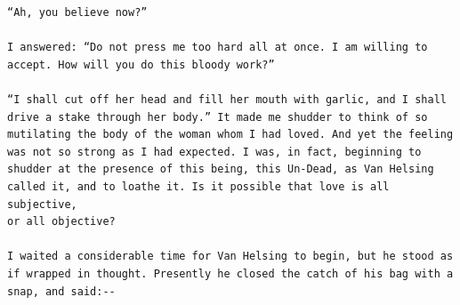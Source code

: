 \documentclass{article}
\begin{document}
\begin{verbatim}
“Ah, you believe now?”

I answered: “Do not press me too hard all at once. I am willing to
accept. How will you do this bloody work?”

“I shall cut off her head and fill her mouth with garlic, and I shall
drive a stake through her body.” It made me shudder to think of so
mutilating the body of the woman whom I had loved. And yet the feeling
was not so strong as I had expected. I was, in fact, beginning to
shudder at the presence of this being, this Un-Dead, as Van Helsing
called it, and to loathe it. Is it possible that love is all subjective,
or all objective?

I waited a considerable time for Van Helsing to begin, but he stood as
if wrapped in thought. Presently he closed the catch of his bag with a
snap, and said:--


\end{verbatim}
\end{document}
